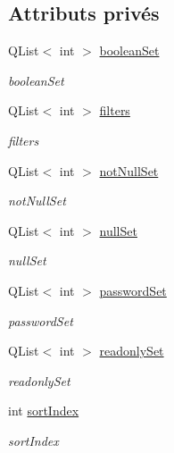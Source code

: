 \subsection*{Attributs privés}
\begin{DoxyCompactItemize}
\item 
Q\-List$<$ int $>$ \hyperlink{classSH__ExtendedProxyModel_a7dd9cf1dd153b98220d217e9be1f0916}{boolean\-Set}
\begin{DoxyCompactList}\small\item\em boolean\-Set \end{DoxyCompactList}\item 
Q\-List$<$ int $>$ \hyperlink{classSH__ExtendedProxyModel_a99a5c4c6b9d125c87f048c76d22278d3}{filters}
\begin{DoxyCompactList}\small\item\em filters \end{DoxyCompactList}\item 
Q\-List$<$ int $>$ \hyperlink{classSH__ExtendedProxyModel_ac17eb2c65d47f6dc6dd322e0a39bbe3e}{not\-Null\-Set}
\begin{DoxyCompactList}\small\item\em not\-Null\-Set \end{DoxyCompactList}\item 
Q\-List$<$ int $>$ \hyperlink{classSH__ExtendedProxyModel_a0a3818c6f8e4b73d1b5b47b2914cb56d}{null\-Set}
\begin{DoxyCompactList}\small\item\em null\-Set \end{DoxyCompactList}\item 
Q\-List$<$ int $>$ \hyperlink{classSH__ExtendedProxyModel_a9616e7be442b560e260e1db9034143bc}{password\-Set}
\begin{DoxyCompactList}\small\item\em password\-Set \end{DoxyCompactList}\item 
Q\-List$<$ int $>$ \hyperlink{classSH__ExtendedProxyModel_ad8e1da8be7d34eefe243a7707be8b166}{readonly\-Set}
\begin{DoxyCompactList}\small\item\em readonly\-Set \end{DoxyCompactList}\item 
int \hyperlink{classSH__ExtendedProxyModel_a83cabe4cf90a26d26c4aaa40e944b2bd}{sort\-Index}
\begin{DoxyCompactList}\small\item\em sort\-Index \end{DoxyCompactList}\end{DoxyCompactItemize}


